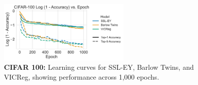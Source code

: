 \begin{figure}[H]
    \centering
    \includegraphics[width=0.57\textwidth]{figures/SSL/cifar100_learning_curve_log_error}
    \caption{\textbf{CIFAR 100: } Learning curves for SSL-EY, Barlow Twins, and VICReg, showing performance across 1,000 epochs.}
    \label{fig:ssl learning curve cifar100 top5}
\end{figure}

